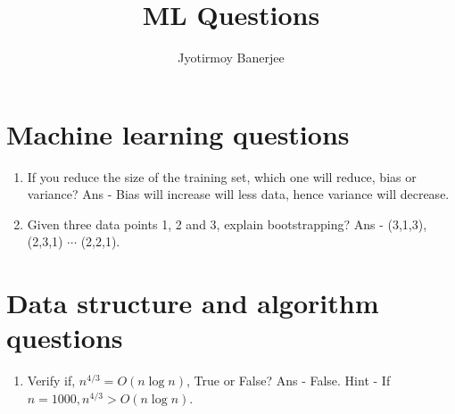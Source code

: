 \documentclass{article}
\title{ML Questions}
\author{Jyotirmoy Banerjee}
\begin{document}
\maketitle

\section{Machine learning questions}

\begin{enumerate}
\item If you reduce the size of the training set, which one will reduce, bias or variance? Ans - Bias will increase will less data, hence variance will decrease.
\item Given three data points 1, 2 and 3, explain bootstrapping? Ans - (3,1,3), (2,3,1) $\cdots$ (2,2,1).
\end{enumerate}

\section{Data structure and algorithm questions}

\begin{enumerate}
\item Verify if, $n^{4/3} = O(n \log n)$, True or False? Ans - False. Hint - If $n = 1000, n^{4/3} > O(n \log n)$.
\end{enumerate}
\end{document}
